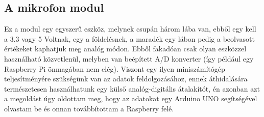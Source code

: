 \documentclass[12pt,a4paper]{article}
\begin{document}
    \subsection{A mikrofon modul}
      Ez a modul egy egyszerű eszköz, melynek csupán három lába van, ebből egy kell a 3.3 vagy 5 Voltnak, egy a földelésnek, a maradék egy lábon pedig a beolvasott értékeket kaphatjuk meg analóg módon. Ebből fakadóan csak olyan eszközzel használható közvetlenül, melyben van beépített A/D konverter (így például egy Raspberry Pi önmagában nem elég). Viszont egy ilyen miniszámítógép teljesítményére szükségünk van az adatok feldolgozásához, ennek áthidalására természetesen használhatunk egy külső analóg-digitális átalakítót, én azonban azt a megoldást úgy oldottam meg, hogy az adatokat egy Arduino UNO segítségével olvastam be és onnan továbbítottam a Raspberry felé.
\end{document}
